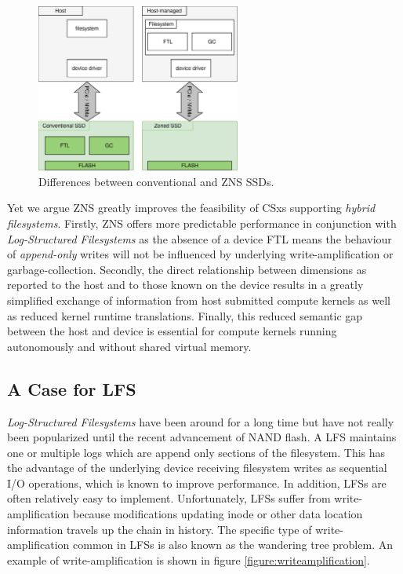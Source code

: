 \begin{figure}
    \centering
	\includegraphics[width=0.6\textwidth]{resources/images/zns-vs-conventional.pdf}
	\caption{Differences between conventional and ZNS SSDs.}
    \label{figure:znsvsconventional}
\end{figure}

Yet we argue ZNS greatly improves the feasibility of CSxs supporting
\textit{hybrid filesystems}. Firstly, ZNS offers more predictable performance in
conjunction with \textit{Log-Structured Filesystems} as the absence of a device
FTL means the behaviour of \textit{append-only} writes will not be influenced by
underlying write-amplification or garbage-collection. Secondly, the direct
relationship between dimensions as reported to the host and to those known on
the device results in a greatly simplified exchange of information from host
submitted compute kernels as well as reduced kernel runtime translations.
Finally, this reduced semantic gap between the host and device is essential for
compute kernels running autonomously and without shared virtual memory.

\subsection{A Case for LFS}

\textit{Log-Structured Filesystems} have been around for a long
time \cite{Rosenblum1992TheDA} but have not really been popularized until the
recent advancement of NAND flash. A LFS maintains one or multiple logs which
are append only sections of the filesystem. This has the advantage of the
underlying device receiving filesystem writes as sequential I/O operations,
which is known to improve performance. In addition, LFSs are often relatively
easy to implement. Unfortunately, LFSs suffer from write-amplification because
modifications updating inode or other data location information travels up the
chain in history. The specific type of write-amplification common in LFSs is
also known as the wandering tree problem. An example of write-amplification is
shown in figure \ref{figure:writeamplification}.

